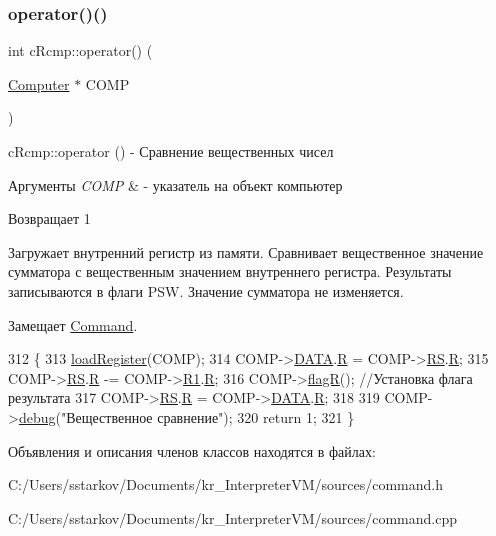 \subsubsection{\texorpdfstring{operator()()}{operator()()}}
{\footnotesize\ttfamily int c\+Rcmp\+::operator() (\begin{DoxyParamCaption}\item[{\hyperlink{class_computer}{Computer} $\ast$}]{C\+O\+MP }\end{DoxyParamCaption})\hspace{0.3cm}{\ttfamily [virtual]}}



c\+Rcmp\+::operator () -\/ Сравнение вещественных чисел 


\begin{DoxyParams}{Аргументы}
{\em C\+O\+MP} & -\/ указатель на объект компьютер \\
\hline
\end{DoxyParams}
\begin{DoxyReturn}{Возвращает}
1
\end{DoxyReturn}
Загружает внутренний регистр из памяти. Сравнивает вещественное значение сумматора с вещественным значением внутреннего регистра. Результаты записываются в флаги P\+SW. Значение сумматора не изменяется. 

Замещает \hyperlink{class_command_a79939b66f3de892e91d7710844294716}{Command}.


\begin{DoxyCode}
312 \{
313     \hyperlink{class_command_aac6f368e7c9dbb357b3f00627d5dabfc}{loadRegister}(COMP);
314     COMP->\hyperlink{class_computer_adb154047da2156e4419af3b3a4a766b7}{DATA}.\hyperlink{union_computer_1_1data_acbf8c96e22bd094bcbb4014818e3570d}{R} = COMP->\hyperlink{class_computer_a874503110664b3cf821118d2ce9c2b96}{RS}.\hyperlink{union_computer_1_1data_acbf8c96e22bd094bcbb4014818e3570d}{R};
315     COMP->\hyperlink{class_computer_a874503110664b3cf821118d2ce9c2b96}{RS}.\hyperlink{union_computer_1_1data_acbf8c96e22bd094bcbb4014818e3570d}{R} -= COMP->\hyperlink{class_computer_a0fbf84599b7db9d634a92afed443ee73}{R1}.\hyperlink{union_computer_1_1data_acbf8c96e22bd094bcbb4014818e3570d}{R};
316     COMP->\hyperlink{class_computer_aae860bb217270ec88e8ebf6fe2c2adc9}{flagR}(); \textcolor{comment}{//Установка флага результата}
317     COMP->\hyperlink{class_computer_a874503110664b3cf821118d2ce9c2b96}{RS}.\hyperlink{union_computer_1_1data_acbf8c96e22bd094bcbb4014818e3570d}{R} = COMP->\hyperlink{class_computer_adb154047da2156e4419af3b3a4a766b7}{DATA}.\hyperlink{union_computer_1_1data_acbf8c96e22bd094bcbb4014818e3570d}{R};
318 
319     COMP->\hyperlink{class_computer_a10ca6c6b200630119201de16d7368e0f}{debug}(\textcolor{stringliteral}{"Вещественное сравнение"});
320     \textcolor{keywordflow}{return} 1;
321 \}
\end{DoxyCode}


Объявления и описания членов классов находятся в файлах\+:\begin{DoxyCompactItemize}
\item 
C\+:/\+Users/sstarkov/\+Documents/kr\+\_\+\+Interpreter\+V\+M/sources/command.\+h\item 
C\+:/\+Users/sstarkov/\+Documents/kr\+\_\+\+Interpreter\+V\+M/sources/command.\+cpp\end{DoxyCompactItemize}
